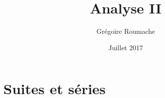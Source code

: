\documentclass[a4paper]{article}
\title{Analyse II}
\author{Grégoire Roumache}
\date{Juillet 2017}
\begin{document}
\maketitle
























\section{Suites et séries}
\end{document}
